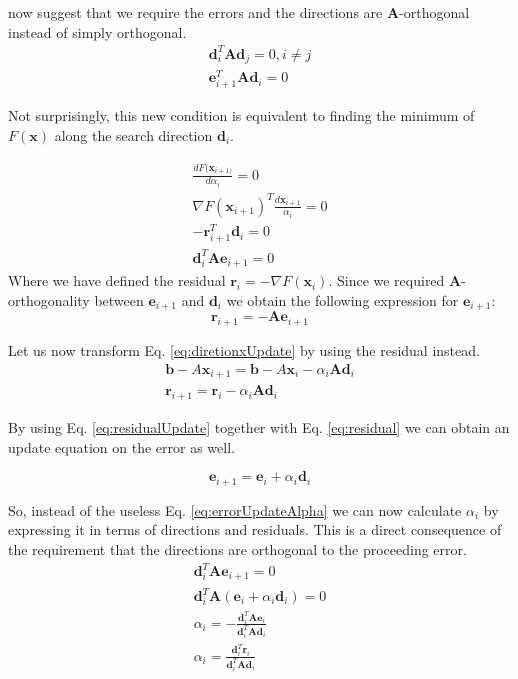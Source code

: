 \documentclass[a4paper,10pt]{article}
\theoremstyle{definition}
\begin{document}
\cite{conjugatedGradients} now suggest that we require the errors and the directions are $\pmb{A}$-orthogonal instead of simply orthogonal.
\begin{gather}
	\pmb{d}_i^T\pmb{A}\pmb{d}_j = 0, i\neq j \\
	\pmb{e}_{i+1}^T\pmb{A}\pmb{d}_i = 0
\end{gather}

Not surprisingly, this new condition is equivalent to finding the minimum of $F(\pmb{x})$ along the search direction $\pmb{d}_i$.

\begin{gather}
	\frac{dF(\pmb{x}_{i+1)}}{d\alpha_i} = 0\\
	\nabla F(\pmb{x}_{i+1})^T \frac{d\pmb{x}_{i+1}}{\alpha_i} = 0\\
	-\pmb{r}^T_{i+1}\pmb{d}_i = 0\\
	\pmb{d}^T_i \pmb{A} \pmb{e}_{i+1} = 0
\end{gather}
Where we have defined the residual $\pmb{r}_i = -\nabla F(\pmb{x}_i)$. Since we required $\pmb{A}$-orthogonality between $\pmb{e}_{i+1}$ and $\pmb{d}_i$ we obtain the following expression for $\pmb{e}_{i+1}$:
\begin{equation}
	\pmb{r}_{i+1} = - \pmb{A} \pmb{e}_{i+1}
	\label{eq:residual}
\end{equation}

Let us now transform Eq. \ref{eq:diretionxUpdate} by using the residual instead.
\begin{gather}
	\pmb{b} - A\pmb{x}_{i+1} = \pmb{b} - A\pmb{x}_{i} - \alpha_i\pmb{A}\pmb{d}_i\\
	\pmb{r}_{i+1} = \pmb{r}_i - \alpha_i \pmb A \pmb{d}_i
	\label{eq:residualUpdate}
\end{gather}

By using Eq. \ref{eq:residualUpdate} together with Eq. \ref{eq:residual} we can obtain an update equation on the error as well.

\begin{equation}
	\pmb{e}_{i+1} = \pmb{e}_{i} + \alpha_i\pmb{d}_i
	\label{eq:errorUpdate}
\end{equation}

So, instead of the useless Eq. \ref{eq:errorUpdateAlpha} we can now calculate $\alpha_i$ by expressing it in terms of directions and residuals. This is a direct consequence of the requirement that the directions are orthogonal to the proceeding error.
\begin{gather}
	\pmb{d}_i^T\pmb{A}\pmb{e}_{i+1} = 0 \\
	\pmb{d}_i^T\pmb{A} (\pmb{e}_{i} + \alpha_i \pmb{d}_i) = 0 \\
	\alpha_i = -\frac{\pmb{d}_i^T\pmb{A} \pmb{e}_{i}}{\pmb{d}_i^T\pmb{A} \pmb{d}_i} \\
	\alpha_i = \frac{\pmb{d}_i^T\pmb{r}_{i}}{\pmb{d}_i^T\pmb{A} \pmb{d}_i}
	\label{eq:alpha}
\end{gather} 
\end{document}

